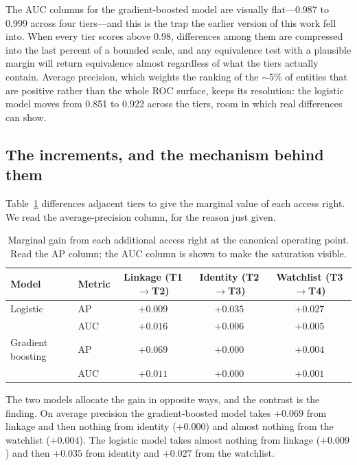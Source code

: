 \documentclass[11pt]{article}
\begin{document}
The AUC columns for the gradient-boosted model are visually flat---0.987 to 0.999 across four
tiers---and this is the trap the earlier version of this work fell into. When every tier scores above
0.98, differences among them are compressed into the last percent of a bounded scale, and any
equivalence test with a plausible margin will return equivalence almost regardless of what the tiers
actually contain. Average precision, which weights the ranking of the $\sim$5\% of entities that are
positive rather than the whole ROC surface, keeps its resolution: the logistic model moves from 0.851
to 0.922 across the tiers, room in which real differences can show.

\subsection{The increments, and the mechanism behind them}
\label{sec:increments}

Table~\ref{tab:increments} differences adjacent tiers to give the marginal value of each access right.
We read the average-precision column, for the reason just given.

\begin{table}[htbp]
\centering
\caption{Marginal gain from each additional access right at the canonical operating point. Read the AP
column; the AUC column is shown to make the saturation visible.}
\label{tab:increments}
\begin{tabular}{llccc}
\toprule
Model & Metric & Linkage (T1$\to$T2) & Identity (T2$\to$T3) & Watchlist (T3$\to$T4) \\
\midrule
Logistic & AP  & $+0.009$ & $+0.035$ & $+0.027$ \\
         & AUC & $+0.016$ & $+0.006$ & $+0.005$ \\
\addlinespace
Gradient boosting & AP  & $+0.069$ & $+0.000$ & $+0.004$ \\
                  & AUC & $+0.011$ & $+0.000$ & $+0.001$ \\
\bottomrule
\end{tabular}
\end{table}

The two models allocate the gain in opposite ways, and the contrast is the finding. On average
precision the gradient-boosted model takes $+0.069$ from linkage and then nothing from identity
($+0.000$) and almost nothing from the watchlist ($+0.004$). The logistic model takes almost nothing
from linkage ($+0.009$) and then $+0.035$ from identity and $+0.027$ from the watchlist.
\end{document}
